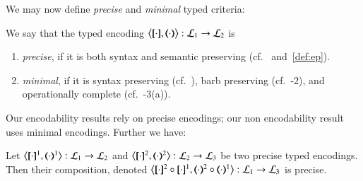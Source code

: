

We may now define \emph{precise} and \emph{minimal} typed criteria: 

\smallskip 

\begin{definition}\rm\label{def:goodenc}
We say that 
	the typed encoding 
	$\enco{\map{\cdot}, \mapt{\cdot} %
	}: \tyl{L}_1 \to \tyl{L}_2$ is 
	\begin{enumerate}[$\bullet$]
	\item \emph{precise}, if it is both syntax and semantic preserving (cf.~ and~\ref{def:ep}).
	\item \emph{minimal}, if it is syntax preserving 
	(cf.~),
	barb preserving (cf.~-2), 
	and operationally complete (cf.~-3(a)).
	\end{enumerate}
\end{definition}

\smallskip 

\noi %
Our encodability results %
rely on precise encodings; 
our non encodability result %
uses minimal encodings.
Further we have:

\smallskip 

\begin{proposition}\rm
	\label{pro:composition}
	Let %
	$\enco{\map{\cdot}^{1}, \mapt{\cdot}^{1}%
	}: \tyl{L}_1 \to \tyl{L}_2$
	and 
	$\enco{\map{\cdot}^{2}, \mapt{\cdot}^{2}%
	}: \tyl{L}_2 \to \tyl{L}_3$
	be two precise typed encodings.
	Then their composition, denoted 
	$\enco{\map{\cdot}^{2} \circ \map{\cdot}^{1}, \mapt{\cdot}^{2} \circ \mapt{\cdot}^{1} %
	}: \tyl{L}_1 \to \tyl{L}_3$
	is precise. 
\end{proposition}

